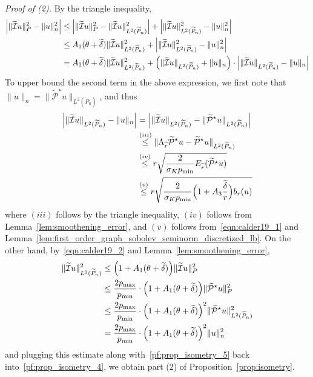 \documentclass[twoside]{article}
\newcommand{\1}{\mathbf{1}}
\newcommand{\Leb}{L}
\newcommand{\mc}[1]{\mathcal{#1}}
\newcommand{\wt}[1]{\widetilde{#1}}
\theoremstyle{definition}
\theoremstyle{remark}
\begin{document}
\textit{Proof of (2).}
By the triangle inequality,
\begin{align}
\Bigl|\|\wt{\mc{I}}u\|_{P}^2 - \|u\|_{n}^2\Bigr| & \leq \Bigl|\|\wt{\mc{I}}u\|_{P}^2 - \|\wt{\mc{I}}u\|_{\Leb^2(\wt{P}_n)}^2\Bigr| + \Bigl|\|\wt{\mc{I}}u\|_{\Leb^2(\wt{P}_n)}^2 - \|u\|_{n}^2\Bigr| \nonumber \\
& \leq A_1(\theta + \wt{\delta}) \|\wt{\mc{I}}u\|_{\Leb^2(\wt{P}_n)}^2 + \Bigl|\|\wt{\mc{I}}u\|_{\Leb^2(\wt{P}_n)}^2 - \|u\|_{n}^2\Bigr| \nonumber\\
& = A_1(\theta + \wt{\delta}) \|\wt{\mc{I}}u\|_{\Leb^2(\wt{P}_n)}^2 + \Bigl(\|\wt{\mc{I}}u\|_{\Leb^2(\wt{P}_n)} + \|u\|_{n}\Bigr) \cdot \Bigl|\|\wt{\mc{I}}u\|_{\Leb^2(\wt{P}_n)} - \|u\|_{n}\Bigr| \label{pf:prop_isometry_4}
\end{align}
To upper bound the second term in the above expression, we first note that~$\|u\|_{n} = \|\wt{\mc{P}}^{\star}u\|_{\Leb^2(\wt{P}_n)}$, and thus
\begin{align}
\Bigl|\|\wt{\mc{I}}u\|_{\Leb^2(\wt{P}_n)} - \|u\|_{n} \Bigr| & = \Bigl|\|\wt{\mc{I}}u\|_{\Leb^2(\wt{P}_n)} - \|\wt{\mc{P}}^{\star}u\|_{\Leb^2(\wt{P}_n)}\Bigr| \nonumber \\
& \overset{(iii)}{\leq} \|\Lambda_{\wt{r}}\wt{\mc{P}}^{\star}u - \wt{\mc{P}}^{\star}u\|_{\Leb^2(\wt{P}_n)} \nonumber \\
& \overset{(iv)}{\leq} r \sqrt{\frac{2}{\sigma_K p_{\min}} E_{\wt{r}}(\wt{\mc{P}}^{\star}u)} \nonumber \\
& \overset{(v)}{\leq} r \sqrt{\frac{2}{\sigma_K p_{\min}} \Bigl(1 + A_3\frac{\wt{\delta}}{r}\Bigr) b_r(u)} \label{pf:prop_isometry_5}
\end{align}
where $(iii)$ follows by the triangle inequality, $(iv)$ follows from Lemma~\ref{lem:smoothening_error}, and $(v)$ follows from~\eqref{eqn:calder19_1} and Lemma~\ref{lem:first_order_graph_sobolev_seminorm_discretized_lb}. On the other hand, by~\eqref{eqn:calder19_2} and Lemma~\ref{lem:smoothening_error},
\begin{align*}
\|\wt{\mc{I}}u\|_{\Leb^2(\wt{P}_n)}^2 & \leq \Bigl(1 + A_1(\theta + \wt{\delta})\Bigr) \|\wt{\mc{I}}u\|_{P}^2 \\
& \leq \frac{2p_{\max}}{p_{\min}} \cdot \Bigl(1 + A_1(\theta + \wt{\delta})\Bigr) \|\wt{\mc{P}}^{\star}u\|_{P}^2 \\
& \leq \frac{2p_{\max}}{p_{\min}} \cdot \Bigl(1 + A_1(\theta + \wt{\delta})\Bigr)^2 \|\wt{\mc{P}}^{\star}u\|_{\Leb^2(\wt{P}_n)}^2 \\
& = \frac{2p_{\max}}{p_{\min}} \cdot \Bigl(1 + A_1(\theta + \wt{\delta})\Bigr)^2 \|u\|_{n}^2
\end{align*}
and plugging this estimate along with~\eqref{pf:prop_isometry_5} back into~\eqref{pf:prop_isometry_4}, we obtain part (2) of Proposition~\ref{prop:isometry}.
\end{document}
